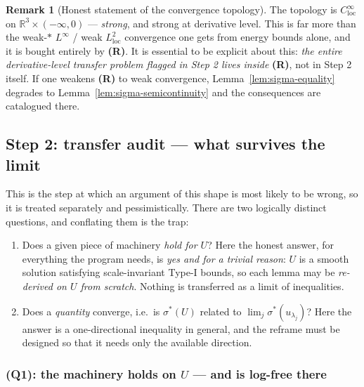 \documentclass[11pt]{article}
\theoremstyle{definition}
\newtheorem{remark}[theorem]{Remark}
\theoremstyle{remark}
\newcommand{\R}{\mathbb{R}}
\begin{document}
\begin{remark}[Honest statement of the convergence topology]
  The topology is $C^\infty_{\mathrm{loc}}$ on
  $\R^3\times(-\infty,0)$ --- \emph{strong}, and strong at derivative level.
  This is far more than the weak-$*$ $L^\infty$ / weak $L^2_{\mathrm{loc}}$
  convergence one gets from energy bounds alone, and it is bought entirely by
  \textbf{(R)}. It is essential to be explicit about this: \emph{the entire
  derivative-level transfer problem flagged in Step 2 lives inside}
  \textbf{(R)}, not in Step 2 itself. If one weakens \textbf{(R)} to weak
  convergence, Lemma~\ref{lem:sigma-equality} degrades to
  Lemma~\ref{lem:sigma-semicontinuity} and the consequences are catalogued
  there.
\end{remark}

\subsection{Step 2: transfer audit --- what survives the limit}
\label{subsec:s39-step2}

This is the step at which an argument of this shape is most likely to be
wrong, so it is treated separately and pessimistically. There are two
logically distinct questions, and conflating them is the trap:

\begin{enumerate}[label=(Q\arabic*)]
\item Does a given piece of machinery \emph{hold for $U$}? Here the honest
  answer, for everything the program needs, is \emph{yes and for a trivial
  reason}: $U$ is a smooth solution satisfying scale-invariant Type-I bounds,
  so each lemma may be \emph{re-derived on $U$ from scratch}. Nothing is
  transferred as a limit of inequalities.
\item Does a \emph{quantity} converge, i.e.\ is $\sigma^*(U)$ related to
  $\lim_j\sigma^*(u_{\lambda_j})$? Here the answer is a one-directional
  inequality in general, and the reframe must be designed so that it needs
  only the available direction.
\end{enumerate}

\subsubsection*{(Q1): the machinery holds on $U$ --- and is log-free there}
\end{document}

